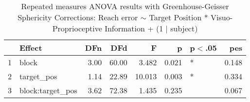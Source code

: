 \begin{table}[t]
\centering
\begin{tabular}{rlrrrrlr}
  \hline
 & Effect & DFn & DFd & F & p & p$<$.05 & pes \\ 
  \hline
1 & block & 3.00 & 60.00 & 3.482 & 0.021 & * & 0.148 \\ 
  2 & target\_pos & 1.14 & 22.89 & 10.013 & 0.003 & * & 0.334 \\ 
  3 & block:target\_pos & 3.62 & 72.38 & 1.435 & 0.235 &  & 0.067 \\ 
   \hline
\end{tabular}
\caption{Repeated measures ANOVA results with Greenhouse-Geisser Sphericity Corrections: Reach error $\sim$ Target Position * Visuo-Proprioceptive Information + (1 $\mid$ subject)}
\label{table:rm-anova}
\end{table}